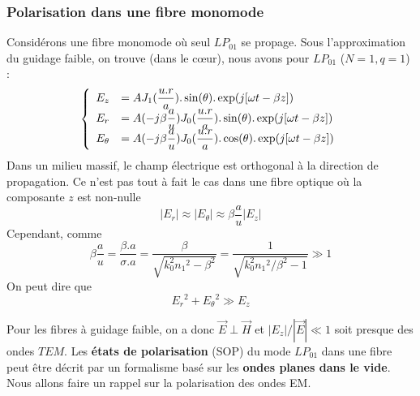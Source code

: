 	\subsubsection{Polarisation dans une fibre monomode}
	Considérons une fibre monomode où seul $LP_{01}$ se propage. Sous l'approximation du guidage
	faible, on trouve (dans le cœur), nous avons pour $LP_{01}$ ($N=1, q=1$) :
	\begin{equation}
	\left\{\begin{array}{ll}
	{E_z} &=\displaystyle A{{J}_1}(\frac{{u.r}}{a}).\sin (\theta ).\exp (j[\omega t - \beta z])\\
	{E_r} &\displaystyle= A( - j\beta \frac{a}{u}){{J}_0}(\frac{{u.r}}{a}).\sin (\theta ).\exp (j[\omega t - \beta z])\\
	{E_\theta } &\displaystyle= A( - j\beta \frac{a}{u}){{J}_0}(\frac{{u.r}}{a}).\cos (\theta ).\exp (j[\omega t - \beta z])
	\end{array}\right.
	\end{equation}
	Dans un milieu massif, le champ électrique est orthogonal à la direction de propagation. Ce 
	n'est pas tout à fait le cas dans une fibre optique où la composante $z$ est non-nulle
	\begin{equation}
	|E_r| \approx |E_\theta| \approx \beta\frac{a}{u}|E_z|
	\end{equation}
	Cependant, comme
	\begin{equation}
	\beta \frac{a}{u} = \frac{{\beta .a}}{{\sigma .a}} = \frac{\beta }{{\sqrt {k_0^2{n_1}^2 - {\beta ^2}} }} = \frac{1}{{\sqrt {k_0^2{n_1}^2/{\beta ^2} - 1} }} \gg 1
	\end{equation}
	On peut dire que
	\begin{equation}
	{E_r}{^2} + {E_\theta }{^2} \gg {E_z}
	\end{equation}
	
	Pour les fibres à guidage faible, on a donc $\vec{E}\perp\vec{H}$ et $|E_z|/|\vec E|\ll 1$ soit
	presque des ondes $TEM$. Les \textbf{états de polarisation} (SOP) du mode $LP_{01}$ dans une
	fibre peut être décrit par un formalisme basé sur les \textbf{ondes planes dans le vide}. Nous
	allons faire un rappel sur la polarisation des ondes EM.	
	
	
